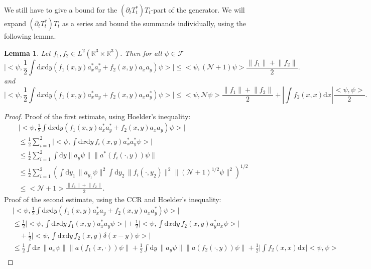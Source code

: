 \documentclass[11pt,a4paper,draft,DIV11]{scrartcl}	%
\newtheorem{lem}[thm]{Lemma}
\newcommand{\fock}{\mathcal{F}}		%
\newcommand{\di}{\textrm{d}}		%
\newcommand{\Ncal}{\mathcal{N}}		%
\newcommand{\scal}[2]{\big<#1,#2\big>} %
\newcommand{\Rbb}{\mathbb{R}}		%
\newcommand{\norm}[1]{\lVert#1\rVert}	%
\newcommand{\ev}[1]{\big<#1\big>}	%
\begin{document}
We still have to give a bound for the $(\partial_t T^*_t)T_t$-part of the generator. We will expand $(\partial_t T^*_t)T_t$ as a series and bound the summands individually, using the following lemma.
\begin{lem}
\label{lm:Bbound}
Let $f_1, f_2 \in L^2(\Rbb^3\times \Rbb^3)$. Then for all $\psi \in \fock$
 \[
\lvert \scal{\psi}{\frac{1}{2} \int \di x\di y \left( f_1(x,y) a^\ast_x a^\ast_y + f_2(x,y) a_x a_y \right) \psi} \rvert \leq \scal{\psi}{(\Ncal+1)\psi} \frac{\norm{f_1}+\norm{f_2}}{2}.
\]
and
\[
 \lvert \scal{\psi}{\frac{1}{2} \int \di x\di y \left( f_1(x,y) a^\ast_x
a_y + f_2(x,y) a_x a^\ast_y \right)  \psi} \rvert
 \leq \scal{\psi}{\Ncal\psi} \frac{\norm{f_1}+\norm{f_2}}{2} + \left\lvert \int f_2(x,x) \di x \right\rvert \frac{\scal{\psi}{\psi}}{2}.
\]
\end{lem}
\begin{proof} Proof of the first estimate, using Hoelder's inequality:
 \begin{align*}
  & \lvert \scal{\psi}{\frac{1}{2} \int \di x\di y \left( f_1(x,y) a^\ast_x a^\ast_y + f_2(x,y) a_x a_y \right) \psi} \rvert \\
& \leq \frac{1}{2} \sum_{i=1}^2 \lvert \scal{\psi}{\int \di x\di y\, f_i(x,y) a^\ast_x a^\ast_y \psi }\rvert \\
& \leq \frac{1}{2} \sum_{i=1}^2 \int \di y \norm{a_y \psi} \norm{a^\ast(f_i(\cdot,y))\psi} \\
& \leq \frac{1}{2} \sum_{i=1}^2 \left( \int \di y_1\, \norm{a_{y_1}\psi}^2 \int \di y_2\, \norm{f_i(\cdot,y_2)}^2 \norm{(\Ncal+1)^{1/2} \psi}^2 \right)^{1/2} \\
& \leq \ev{\Ncal+1} \frac{\norm{f_1}+\norm{f_2}}{2}.
 \end{align*}
Proof of the second estimate, using the CCR and Hoelder's inequality:
 \begin{align*}
& \lvert \scal{\psi}{\frac{1}{2} \int \di x\di y \left( f_1(x,y) a^\ast_x a_y + f_2(x,y) a_x a^\ast_y \right)  \psi} \rvert\\
& \leq \frac{1}{2} \lvert \scal{\psi}{\int \di x\di y\, f_1(x,y) a^\ast_x a_y \psi} \rvert + \frac{1}{2}\lvert \scal{\psi}{\int \di x \di y\, f_2(x,y) a^\ast_y a_x \psi}\rvert \\
&\quad + \frac{1}{2} \lvert \scal{\psi}{\int \di x \di y\, f_2(x,y) \delta(x-y) \psi}\rvert \\
& \leq \frac{1}{2} \int \di x\, \norm{a_x \psi} \norm{a(f_1(x,\cdot))\psi} + \frac{1}{2} \int \di y\, \norm{a_y\psi} \norm{a(f_2(\cdot,y))\psi} + \frac{1}{2} \lvert \int f_2(x,x) \di x \rvert \scal{\psi}{\psi} \\

\end{align*}
\end{proof}
\end{document}
